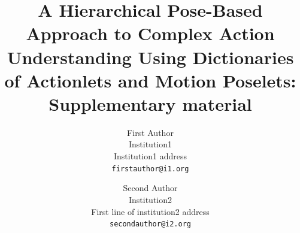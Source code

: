 \documentclass[10pt,letterpaper]{article}
\newcommand{\+}[1]{\ensuremath{{\boldsymbol #1}}}
\begin{document}
\title{A Hierarchical Pose-Based Approach to Complex Action Understanding Using
Dictionaries of Actionlets and Motion Poselets:\\Supplementary material}

\author{First Author\\
Institution1\\
Institution1 address\\
{\tt\small firstauthor@i1.org}
\and
Second Author\\
Institution2\\
First line of institution2 address\\
{\tt\small secondauthor@i2.org}
}

\maketitle




%
%
%
%
%
\end{document}
